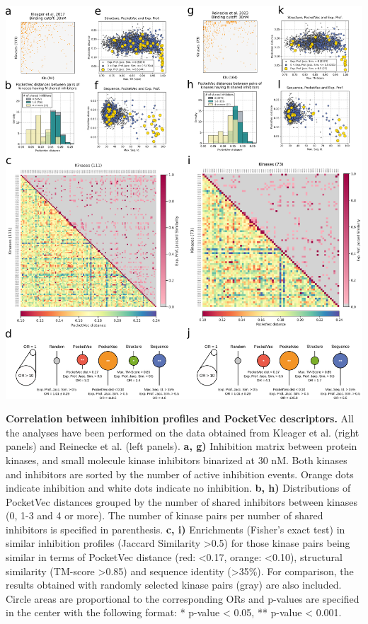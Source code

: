 \begin{Figure_modified}
 \begin{center}
  \includegraphics[width=1\textwidth]{figures/PocketVec/Main/Fig7.png}
  \caption{\textbf{Correlation between inhibition profiles and PocketVec descriptors.} All the analyses have been performed on the data obtained from Kleager et al.\cite{klaeger_target_2017} (right panels) and Reinecke et al.\cite{reinecke_chemical_2023} (left panels).
    \textbf{a, g)} Inhibition matrix between protein kinases, and small molecule kinase inhibitors binarized at 30 nM. Both kinases and inhibitors are sorted by the number of active inhibition events. Orange dots indicate inhibition and white dots indicate no inhibition.
    \textbf{b, h)} Distributions of PocketVec distances grouped by the number of shared inhibitors between kinases (0, 1-3 and 4 or more). The number of kinase pairs per number of shared inhibitors is specified in parenthesis.
    \textbf{c, i)} Enrichments (Fisher’s exact test) in similar inhibition profiles (Jaccard Similarity >0.5) for those kinase pairs being similar in terms of PocketVec distance (red: <0.17, orange: <0.10), structural similarity (TM-score >0.85) and sequence identity (>35\%). For comparison, the results obtained with randomly selected kinase pairs (gray) are also included. Circle areas are proportional to the corresponding ORs and p-values are specified in the center with the following format: * p-value < 0.05, ** p-value < 0.001.
}
\end{center}
\end{Figure_modified}
